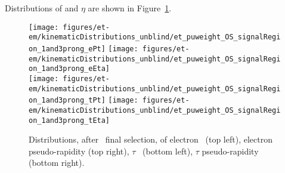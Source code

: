 Distributions of \pt and $\eta$ are shown in Figure~\ref{fig:etau_sr_pt_eta}.
\begin{figure}[thbp!]\centering
  \texttt{[image: figures/et-em/kinematicDistributions\_unblind/et\_puweight\_OS\_signalRegion\_1and3prong\_ePt]}
  \texttt{[image: figures/et-em/kinematicDistributions\_unblind/et\_puweight\_OS\_signalRegion\_1and3prong\_eEta]} \\
  \texttt{[image: figures/et-em/kinematicDistributions\_unblind/et\_puweight\_OS\_signalRegion\_1and3prong\_tPt]}
  \texttt{[image: figures/et-em/kinematicDistributions\_unblind/et\_puweight\_OS\_signalRegion\_1and3prong\_tEta]}
  \caption{\label{fig:etau_sr_pt_eta} Distributions, after \teth ~final
    selection, of electron \pt ~(top left), electron pseudo-rapidity
    (top right), $\tau$ \pt ~(bottom left), $\tau$ pseudo-rapidity
    (bottom right).}
\end{figure}




